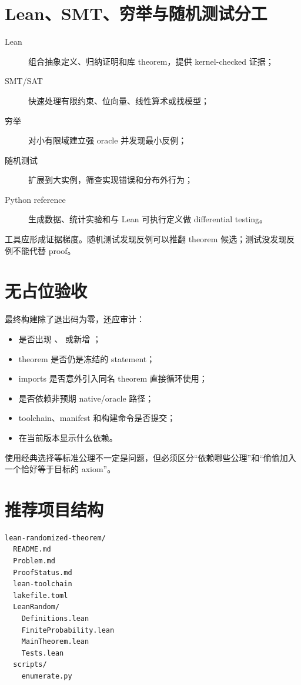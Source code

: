 \section{Lean、SMT、穷举与随机测试分工}

\begin{description}
  \item[Lean] 组合抽象定义、归纳证明和库 theorem，提供 kernel-checked 证据；
  \item[SMT/SAT] 快速处理有限约束、位向量、线性算术或找模型；
  \item[穷举] 对小有限域建立强 oracle 并发现最小反例；
  \item[随机测试] 扩展到大实例，筛查实现错误和分布外行为；
  \item[Python reference] 生成数据、统计实验和与 Lean 可执行定义做 differential testing。
\end{description}

工具应形成证据梯度。随机测试发现反例可以推翻 theorem 候选；测试没发现反例不能代替 proof。

\section{无占位验收}

最终构建除了退出码为零，还应审计：
\begin{itemize}
  \item 是否出现 、 或新增 ；
  \item theorem 是否仍是冻结的 statement；
  \item imports 是否意外引入同名 theorem 直接循环使用；
  \item 是否依赖非预期 native/oracle 路径；
  \item toolchain、manifest 和构建命令是否提交；
  \item {} 在当前版本显示什么依赖。
\end{itemize}

使用经典选择等标准公理不一定是问题，但必须区分“依赖哪些公理”和“偷偷加入一个恰好等于目标的 axiom”。

\section{推荐项目结构}

\begin{lstlisting}[language={}]
lean-randomized-theorem/
  README.md
  Problem.md
  ProofStatus.md
  lean-toolchain
  lakefile.toml
  LeanRandom/
    Definitions.lean
    FiniteProbability.lean
    MainTheorem.lean
    Tests.lean
  scripts/
    enumerate.py
\end{lstlisting}

